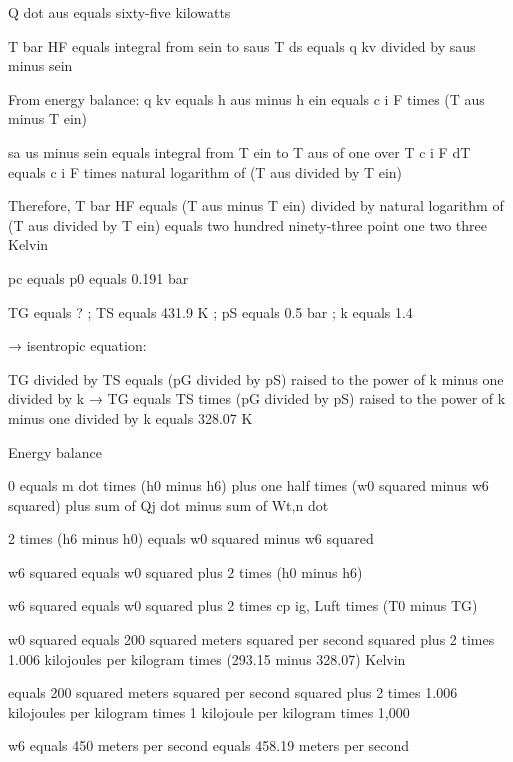 Q dot aus equals sixty-five kilowatts

T bar HF equals integral from sein to saus T ds equals q kv divided by saus minus sein

From energy balance: q kv equals h aus minus h ein equals c i F times (T aus minus T ein)

sa us minus sein equals integral from T ein to T aus of one over T c i F dT equals c i F times natural logarithm of (T aus divided by T ein)

Therefore, T bar HF equals (T aus minus T ein) divided by natural logarithm of (T aus divided by T ein) equals two hundred ninety-three point one two three Kelvin

pc equals p0 equals 0.191 bar

TG equals ? ; TS equals 431.9 K ; pS equals 0.5 bar ; k equals 1.4

→ isentropic equation:

TG divided by TS equals (pG divided by pS) raised to the power of k minus one divided by k → TG equals TS times (pG divided by pS) raised to the power of k minus one divided by k equals 328.07 K

Energy balance

0 equals m dot times (h0 minus h6) plus one half times (w0 squared minus w6 squared) plus sum of Qj dot minus sum of Wt,n dot

2 times (h6 minus h0) equals w0 squared minus w6 squared

w6 squared equals w0 squared plus 2 times (h0 minus h6)

w6 squared equals w0 squared plus 2 times cp ig, Luft times (T0 minus TG)

w0 squared equals 200 squared meters squared per second squared plus 2 times 1.006 kilojoules per kilogram times (293.15 minus 328.07) Kelvin

equals 200 squared meters squared per second squared plus 2 times 1.006 kilojoules per kilogram times 1 kilojoule per kilogram times 1,000

w6 equals 450 meters per second equals 458.19 meters per second